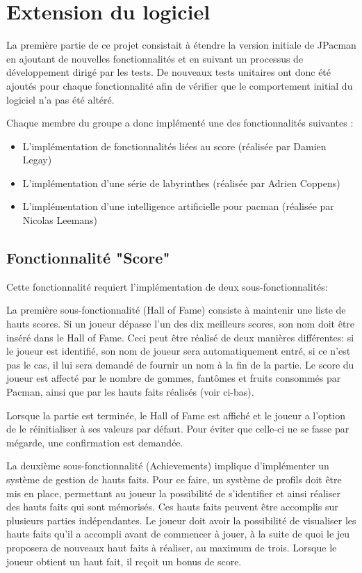 \documentclass[12pt, openany]{report}
\begin{document}
\section{Extension du logiciel}\label{extensions}

La première partie de ce projet consistait à étendre la version initiale de JPacman en ajoutant de nouvelles fonctionnalités et en suivant un processus de développement dirigé par les tests. De nouveaux tests unitaires ont donc été ajoutés pour chaque fonctionnalité afin de vérifier que le comportement initial du logiciel n’a pas été altéré. 

Chaque membre du groupe a donc implémenté une des fonctionnalités suivantes :
\begin{itemize}
\item L'implémentation de fonctionnalités liées au score (réalisée par Damien Legay)
\item L'implémentation d'une série de labyrinthes (réalisée par Adrien Coppens)
\item L'implémentation d'une intelligence artificielle pour pacman (réalisée par Nicolas Leemans)
\end{itemize}


\subsection{Fonctionnalité "Score"}\label{score}
Cette fonctionnalité requiert l'implémentation de deux sous-fonctionnalités:

La première sous-fonctionnalité (Hall of Fame) consiste à maintenir une liste de hauts scores. Si un joueur dépasse l'un des dix meilleurs scores, son nom doit être inséré dans le Hall of Fame.
Ceci peut être réalisé de deux manières différentes: si le joueur est identifié, son nom de joueur sera automatiquement entré, si ce n'est pas le cas, il lui sera demandé de fournir un nom à la fin de la partie.
Le score du joueur est affecté par le nombre de gommes, fantômes et fruits consommés par Pacman, ainsi que par les hauts faits réalisés (voir ci-bas).

Lorsque la partie est terminée, le Hall of Fame est affiché et le joueur a l'option de le réinitialiser à ses valeurs par défaut. Pour éviter que celle-ci ne se fasse par mégarde, une confirmation est demandée.

La deuxième sous-fonctionnalité (Achievements) implique d'implémenter un système de gestion de hauts faits. 
Pour ce faire, un système de profils doit être mis en place, permettant au joueur la possibilité de s'identifier et ainsi réaliser des hauts faits qui sont mémorisés.
Ces hauts faits peuvent être accomplis sur plusieurs parties indépendantes.
Le joueur doit avoir la possibilité de visualiser les hauts faits qu'il a accompli avant de commencer à jouer, à la suite de quoi le jeu proposera de nouveaux haut faits à réaliser, au maximum de trois.
Lorsque le joueur obtient un haut fait, il reçoit un bonus de score.
\end{document}
